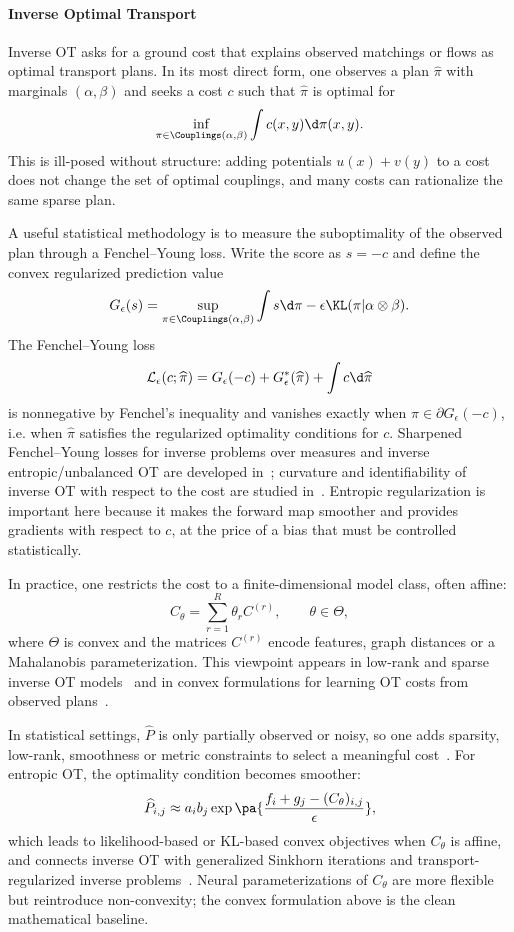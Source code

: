 \paragraph{Inverse Optimal Transport}

Inverse OT asks for a ground cost that explains observed matchings or flows as optimal transport plans. In its most direct form, one observes a plan $\widehat\pi$ with marginals $(\alpha,\beta)$ and seeks a cost $c$ such that $\widehat\pi$ is optimal for
\[
	\inf_{\pi\in\Couplings(\alpha,\beta)}\int c(x,y)\d\pi(x,y).
\]
This is ill-posed without structure: adding potentials $u(x)+v(y)$ to a cost does not change the set of optimal couplings, and many costs can rationalize the same sparse plan.

A useful statistical methodology is to measure the suboptimality of the observed plan through a Fenchel--Young loss. Write the score as $s=-c$ and define the convex regularized prediction value
\[
	G_\epsilon(s)=
	\sup_{\pi\in\Couplings(\alpha,\beta)}
	\int s\d\pi-\epsilon\KL(\pi|\alpha\otimes\beta).
\]
The Fenchel--Young loss
\[
	\mathcal L_\epsilon(c;\widehat\pi)
	=
	G_\epsilon(-c)+G_\epsilon^*(\widehat\pi)+\int c\d\widehat\pi
\]
is nonnegative by Fenchel's inequality and vanishes exactly when $\widehat\pi\in\partial G_\epsilon(-c)$, i.e. when $\widehat\pi$ satisfies the regularized optimality conditions for $c$. Sharpened Fenchel--Young losses for inverse problems over measures and inverse entropic/unbalanced OT are developed in~\cite{andrade2025sharpened}; curvature and identifiability of inverse OT with respect to the cost are studied in~\cite{peyre2026curvature}. Entropic regularization is important here because it makes the forward map smoother and provides gradients with respect to $c$, at the price of a bias that must be controlled statistically.

In practice, one restricts the cost to a finite-dimensional model class, often affine:
\[
	C_\theta=\sum_{r=1}^R \theta_r C^{(r)},
	\qquad \theta\in\Theta,
\]
where $\Theta$ is convex and the matrices $C^{(r)}$ encode features, graph distances or a Mahalanobis parameterization. This viewpoint appears in low-rank and sparse inverse OT models~\cite{dupuy2016estimating,andrade2024sparsistency} and in convex formulations for learning OT costs from observed plans~\cite{ma2020learning,peyre2026curvature}.

In statistical settings, $\widehat P$ is only partially observed or noisy, so one adds sparsity, low-rank, smoothness or metric constraints to select a meaningful cost~\cite{dupuy2016estimating,andrade2024sparsistency}. For entropic OT, the optimality condition becomes smoother:
\[
	\widehat P_{i,j}\approx a_i b_j
	\exp\pa{\frac{f_i+g_j-(C_\theta)_{i,j}}{\epsilon}},
\]
which leads to likelihood-based or KL-based convex objectives when $C_\theta$ is affine, and connects inverse OT with generalized Sinkhorn iterations and transport-regularized inverse problems~\cite{karlsson2016generalized,ma2020learning}. Neural parameterizations of $C_\theta$ are more flexible but reintroduce non-convexity; the convex formulation above is the clean mathematical baseline.


